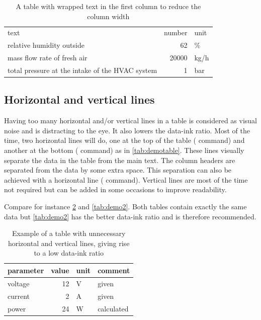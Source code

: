 \begin{table}\centering
    \caption{A table  with wrapped text in the first column to reduce the column width}\label{tab:align2}
    \begin{tabular}{p{4.5cm}rl}  
        \toprule
        text        &  number  & unit \\[1ex]
        relative humidity outside       &   62    & \% \\
        mass flow rate of fresh air     &   \num{20000}     & \unit{kg/h}\\
        total pressure at the intake of the HVAC system                       &   1   & bar\\
        \bottomrule
    \end{tabular}
\end{table}


\subsection{Horizontal and vertical lines}
Having too many horizontal and/or vertical lines in a table is considered as visual noise and is distracting to the eye. It also lowers the data-ink ratio. Most of the time, two horizontal lines will do, one at the top of the table ( command) and another at the bottom ( command) as in \cref{tab:demotable}. These lines visually separate the data in the table from the main text. The column headers are separated from the data by some extra space. This separation can also be achieved with a horizontal line ( command). Vertical lines are most of the time not required but can be added in some occasions to improve readability.

Compare for instance \cref{tab:demo1} and \cref{tab:demo2}. Both tables contain exactly the same data but \cref{tab:demo2} has the better data-ink ratio and is therefore recommended.

\begin{table}\centering
    \caption{Example of a table with unnecessary horizontal and vertical lines, giving rise to a low data-ink ratio}\label{tab:demo1}
    \begin{tabular}{|l|r|l|l|} 
        \hline
         parameter  &  value & unit         & comment\\[1.5ex]    
         \hline
         voltage    &  12   & \unit{\volt}    & given\\
         \hline
         current    &  2    & \unit{\ampere}  & given\\
         \hline
        power       &  24   & \unit{\watt}    & calculated\\
        \hline
    \end{tabular}
\end{table}

